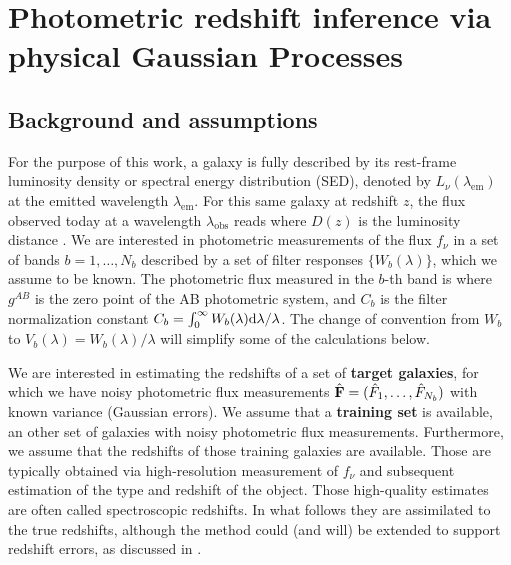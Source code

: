 \documentclass[aps,prd,showpacs,superscriptaddress,groupedaddress]{revtex4}  %
\begin{document}
\section{Photometric redshift inference via physical Gaussian Processes}\label{sec:methods}


\subsection{Background and assumptions}

For the purpose of this work, a galaxy is fully described by its rest-frame luminosity density or spectral energy distribution (SED), denoted by $L_\nu(\lambda_\mathrm{em})$ at the emitted wavelength $\lambda_\mathrm{em}$.
For this same galaxy at redshift $z$, the flux observed today at a wavelength $\lambda_\mathrm{obs}$ reads
where $D(z)$ is the luminosity distance \cite{Hogg:2002yh}. 
We are interested in photometric measurements of the flux $f_\nu$ in a set of bands $b=1, \dots, N_b$ described by a set of filter responses $\{ W_b(\lambda) \}$, which we assume to be known.
The photometric flux measured in the $b$-th band is
where $g^{AB}$ is the zero point of the AB photometric system, and $C_b$ is the filter normalization constant $C_b = \int_0^\infty W_b(\lambda) \mathrm{d}\lambda / \lambda$. The change of convention from $W_b$ to  $V_b(\lambda) = W_b(\lambda)/\lambda$ will simplify some of the calculations below.

We are interested in estimating the redshifts of a set of {\bf target galaxies}, for which we have noisy photometric flux measurements $\hat{\mat{F}}=(\hat{F}_1, \dots, \hat{F}_{N_b})$ with known variance (\eg Gaussian errors). 
We assume that a {\bf training set} is available, \ie an other set of galaxies with noisy photometric flux measurements.
Furthermore, we assume that the redshifts of those training galaxies are available.
Those are typically obtained via high-resolution measurement of $f_\nu$ and subsequent estimation of the type and redshift of the object.
Those high-quality estimates are often called spectroscopic redshifts.
In what follows they are assimilated to the true redshifts, although the method could (and will) be extended to support redshift errors, as discussed in . 
\end{document}
